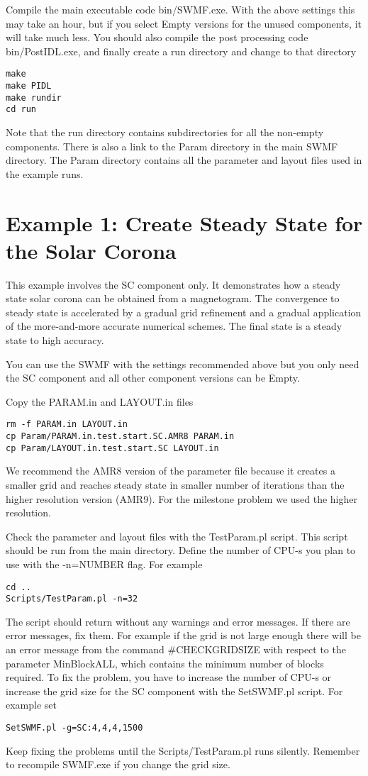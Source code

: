 Compile the main executable code bin/SWMF.exe. With the above
settings this may take an hour, but if you select Empty versions
for the unused components, it will take much less.
You should also compile the post processing code bin/PostIDL.exe,
and finally create a run directory and change to that directory
\begin{verbatim}
make
make PIDL
make rundir
cd run
\end{verbatim}
Note that the run directory contains subdirectories for all the
non-empty components. There is also a link to the Param directory
in the main SWMF directory. The Param directory contains all the
parameter and layout files used in the example runs.

\section{Example 1: Create Steady State for the Solar Corona}

This example involves the SC component only. It demonstrates
how a steady state solar corona can be obtained from
a magnetogram. The convergence to steady state is accelerated by 
a gradual grid refinement and a gradual application of the
more-and-more accurate numerical schemes. The final state
is a steady state to high accuracy. 

You can use the SWMF with the settings recommended above
but you only need the SC component and
all other component versions can be Empty.

Copy the PARAM.in and LAYOUT.in files
\begin{verbatim}
rm -f PARAM.in LAYOUT.in
cp Param/PARAM.in.test.start.SC.AMR8 PARAM.in
cp Param/LAYOUT.in.test.start.SC LAYOUT.in
\end{verbatim}
We recommend the AMR8 version of the parameter file because it creates
a smaller grid and reaches steady state in smaller number of iterations
than the higher resolution version (AMR9). For the milestone problem
we used the higher resolution.

Check the parameter and layout files with the TestParam.pl script. 
This script should be run from the main directory.
Define the number of CPU-s you plan to use with the -n=NUMBER flag.
For example
\begin{verbatim}
cd ..
Scripts/TestParam.pl -n=32
\end{verbatim}
The script should return without any warnings and error messages.
If there are error messages, fix them. 
For example if the grid is not large enough there will be an 
error message from the command \#CHECKGRIDSIZE with respect
to the parameter  MinBlockALL, which contains the minimum number
of blocks required. To fix the problem, you have to increase the number 
of CPU-s or increase the grid size for the SC component with the 
SetSWMF.pl script. For example set
\begin{verbatim}
SetSWMF.pl -g=SC:4,4,4,1500
\end{verbatim}
Keep fixing the problems until the Scripts/TestParam.pl runs silently.
Remember to recompile SWMF.exe if you change the grid size.

